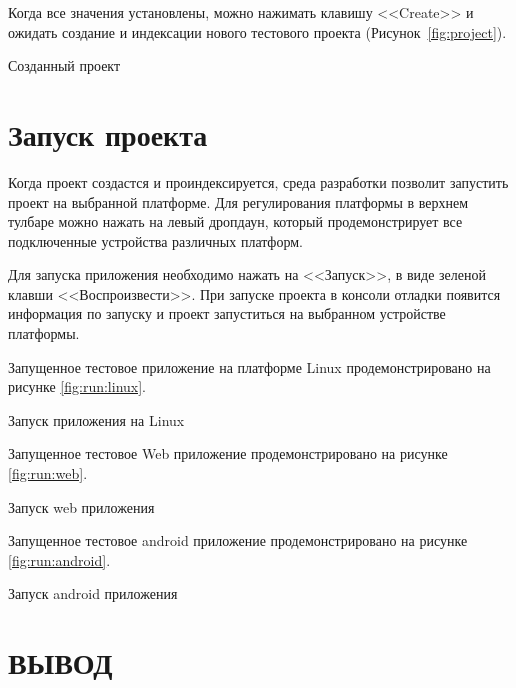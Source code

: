 Когда все значения установлены, можно нажимать клавишу <<Create>>
и ожидать создание и индексации нового тестового проекта
(Рисунок~\ref{fig:project}).

\begin{image}
	\caption{Созданный проект}
	\label{fig:project}
\end{image}

\section{Запуск проекта}

Когда проект создастся и проиндексируется,
среда разработки позволит запустить проект на выбранной платформе.
Для регулирования платформы в верхнем тулбаре можно нажать на левый дропдаун,
который продемонстрирует все подключенные устройства различных платформ.\par
Для запуска приложения необходимо нажать на <<Запуск>>, в виде зеленой клавши
<<Воспроизвести>>. При запуске проекта в консоли отладки появится информация
по запуску и проект запуститься на выбранном устройстве платформы.

Запущенное тестовое приложение на платформе Linux
продемонстрировано на рисунке \ref{fig:run:linux}.

\begin{image}
	\caption{Запуск приложения на Linux}
	\label{fig:run:linux}
\end{image}

Запущенное тестовое Web приложение
продемонстрировано на рисунке \ref{fig:run:web}.

\begin{image}
	\caption{Запуск web приложения}
	\label{fig:run:web}
\end{image}
\clearpage

Запущенное тестовое android приложение
продемонстрировано на рисунке \ref{fig:run:android}.

\begin{image}
	\caption{Запуск android приложения}
	\label{fig:run:android}
\end{image}
\clearpage

\clearpage

\section*{ВЫВОД}

